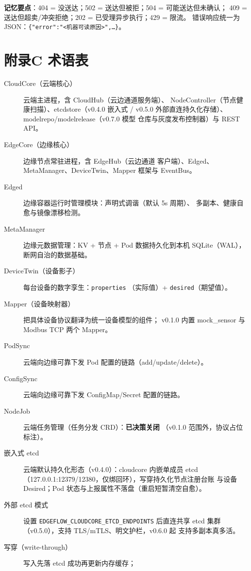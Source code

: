 \textbf{记忆要点}：404 = 没送达；502 = 送达但被拒；504 = 可能送达但未确认；
409 = 送达但超卖/冲突拒绝；202 = 已受理异步执行；429 = 限流。
错误响应统一为 JSON：\texttt{\{"error":"<机器可读原因>",\ldots\}}。

\chapter{附录C 术语表}
\label{app:C}

\begin{description}
  \item[CloudCore（云端核心）] 云端主进程，含 CloudHub（云边通道服务端）、
        NodeController（节点健康扫描）、etcdstore（v0.4.0 嵌入式 /
        v0.5.0 外部直连持久化存储）、modelrepo/modelrelease（v0.7.0 模型
        仓库与灰度发布控制器）与 REST API。
  \item[EdgeCore（边缘核心）] 边缘节点常驻进程，含 EdgeHub（云边通道
        客户端）、Edged、MetaManager、DeviceTwin、Mapper 框架与 EventBus。
  \item[Edged] 边缘容器运行时管理模块：声明式调谐（默认 5s 周期）、
        多副本、健康自愈与镜像漂移检测。
  \item[MetaManager] 边缘元数据管理：KV + 节点 + Pod 数据持久化到本机
        SQLite（WAL），断网自治的数据基础。
  \item[DeviceTwin（设备影子）] 每台设备的数字孪生：\texttt{properties}
        （实际值）+ \texttt{desired}（期望值）。
  \item[Mapper（设备映射器）] 把具体设备协议翻译为统一设备模型的组件；
        v0.1.0 内置 mock\_sensor 与 Modbus TCP 两个 Mapper。
  \item[PodSync] 云端向边缘可靠下发 Pod 配置的链路（add/update/delete）。
  \item[ConfigSync] 云端向边缘可靠下发 ConfigMap/Secret 配置的链路。
  \item[NodeJob] 云端任务管理（任务分发 CRD）：\textbf{已决策关闭}
        （v0.1.0 范围外，协议占位标注）。
  \item[嵌入式 etcd] 云端默认持久化形态（v0.4.0）：cloudcore 内嵌单成员
        etcd（127.0.0.1:12379/12380，仅绑回环），写穿持久化节点注册台账
        与设备 Desired；Pod 状态与上报属性不落盘（重启短暂清空自愈）。
  \item[外部 etcd 模式] 设置 \texttt{EDGEFLOW\_CLOUDCORE\_ETCD\_ENDPOINTS}
        后直连共享 etcd 集群（v0.5.0），支持 TLS/mTLS、明文护栏，v0.6.0 起
        支持多副本真多活。
  \item[写穿（write-through）] 写入先落 etcd 成功再更新内存缓存；

\end{description}
